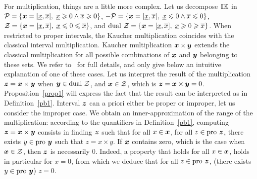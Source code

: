 \documentclass{sig-alternate-05-2015}
\newcommand{\pro}{\mbox{pro }}
\def\K{{\Bbb I \Bbb K}}
\begin{document}
For multiplication, things are a little more complex. Let us decompose $\K$ in ${\cal P} = \{\x=[\underline x,\overline x], \; \underline x \geqslant 0 \wedge
\overline x \geqslant 0\}$, ${- \cal P} = \{\x=[\underline x,\overline x], \; \underline x \leqslant 0 \wedge
\overline x \leqslant 0\}$, 
${\cal Z} = \{\x=[\underline x,\overline x], \; \underline x \leqslant 0 \leqslant \overline x\}$, and 
${\mbox{dual } \cal Z} = \{\x=[\underline x,\overline x], \; \underline x \geqslant 0 \geqslant \overline x\}$. 
When restricted to proper intervals, the Kaucher multiplication coincides with the 
classical interval multiplication. 
Kaucher multiplication $\x \times \y$ extends the classical multiplication for all possible combinations of $\x$ and $\y$
belonging to these sets. We refer to~\cite{Kaucher} for full details, and only give below an intuitive explanation of one of these cases.
Let us  interpret the result of the multiplication $\z = \x \times \y$ when $\y \in \mbox{dual } \cal Z$, 
and $\x \in {\cal Z}$, which is $\z = \x \times \y = 0$. Proposition~\ref{prop1} will express the fact that 
the result can be interpreted as in Definition~\ref{pb1}. Interval $\z$ can a priori either be proper or improper, 
let us consider the improper case. We obtain an inner-approximation of the range of the multiplication: 
according to the quantifiers in Definition~\ref{pb1}, 
computing $\z = \x \times \y$ consists in finding $\z$ such that 
for all $x \in \x$, for all $z \in \pro \z$, there exists $y \in \pro \y$ such that $z=x \times y$. If $\x$ contains zero, 
which is the case when $\x \in {\cal Z}$, then $\z$ is necessarily $0$. 
Indeed, a property that holds for all $x \in \x$, holds in particular for $x=0$, from which we deduce that 
for all $z \in \pro \z$, (there exists $y \in \pro \y$) $z=0$.
\end{document}
